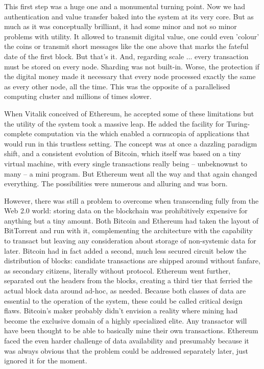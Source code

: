 This first step was a huge one and a monumental turning point. Now we had authentication and value transfer baked into the system at its very core. But as much as it was conceptually brilliant, it had some minor and not so minor problems with utility. It allowed to transmit digital value, one could even 'colour' the coins or transmit short messages like the one above that marks the fateful date of the first block. But that's it. And, regarding scale ... every transaction must be stored on every node. Sharding was not built-in. Worse, the protection if the digital money made it necessary that every node processed exactly the same as every other node, all the time. This was the opposite of a parallelised computing cluster and millions of times slower.

When Vitalik conceived of Ethereum, he accepted some of these limitations but the utility of the system took a massive leap. He added the facility for Turing-complete computation via the  which enabled a cornucopia of applications that would run in this trustless setting. The concept was at once a dazzling paradigm shift, and a consistent evolution of Bitcoin, which itself was based on a tiny virtual machine, with every single transactions really being – unbeknownst to many – a mini program. But Ethereum went all the way and that again changed everything. The possibilities were numerous and alluring and  was born.

However, there was still a problem to overcome when transcending fully from the Web 2.0 world: storing data on the blockchain was prohibitively expensive for anything but a tiny amount. Both Bitcoin and Ethereum had taken the layout of BitTorrent and run with it, complementing the architecture with the capability to transact but leaving any consideration about storage of non-systemic data for later. Bitcoin had in fact added a second, much less secured circuit below the distribution of blocks: candidate transactions are shipped around without fanfare, as secondary citizens, literally without protocol. Ethereum went further, separated out the headers from the blocks, creating a third tier that ferried the actual block data around ad-hoc, as needed. Because both classes of data are essential to the operation of the system, these could be called critical design flaws. Bitcoin's maker probably didn't envision a reality where mining had become the exclusive domain of a highly specialized elite. Any transactor will have been thought to be able to basically mine their own transactions. Ethereum faced the even harder challenge of data availability and presumably because it was always obvious that the problem could be addressed separately later, just ignored it for the moment. 

